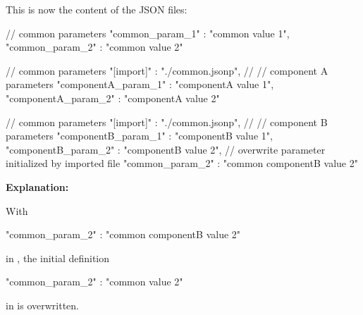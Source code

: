 \vspace{2ex}

This is now the content of the JSON files:

\vspace{2ex}

\textbullet {}

\begin{pythoncode}
{
   // common parameters
   "common_param_1" : "common value 1",
   "common_param_2" : "common value 2"
}
\end{pythoncode}

\textbullet {}

\begin{pythoncode}
{
   // common parameters
   "[import]" : "./common.jsonp",
   //
   // component A parameters
   "componentA_param_1" : "componentA value 1",
   "componentA_param_2" : "componentA value 2"
}
\end{pythoncode}

\textbullet {}

\begin{pythoncode}[linebackgroundcolor=\hlcode{8,9}]
{
   // common parameters
   "[import]" : "./common.jsonp",
   //
   // component B parameters
   "componentB_param_1" : "componentB value 1",
   "componentB_param_2" : "componentB value 2",
   // overwrite parameter initialized by imported file
   "common_param_2" : "common componentB value 2"
}
\end{pythoncode}


\newpage

\textbf{Explanation:}

\vspace{2ex}

With

\begin{pythoncode}
   "common_param_2" : "common componentB value 2"
\end{pythoncode}

in , the initial definition

\begin{pythoncode}
   "common_param_2" : "common value 2"
\end{pythoncode}

in  is overwritten.

\vspace{2ex}

